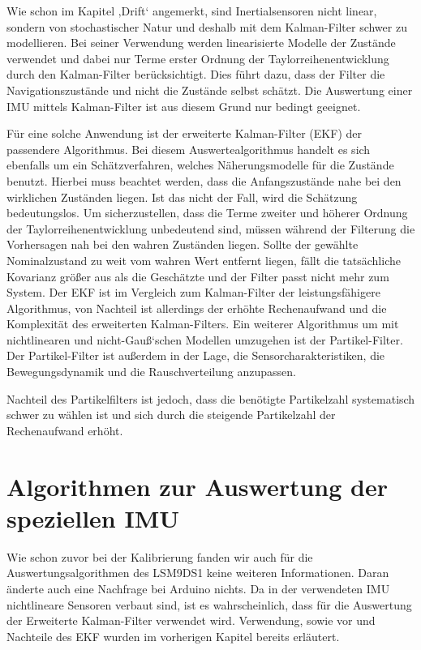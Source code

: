 Wie schon im Kapitel ‚Drift‘ angemerkt, sind Inertialsensoren nicht linear, sondern von stochastischer Natur und deshalb mit dem Kalman-Filter schwer zu modellieren. Bei seiner Verwendung werden linearisierte Modelle der Zustände verwendet und dabei nur Terme erster Ordnung der Taylorreihenentwicklung durch den Kalman-Filter berücksichtigt.  Dies führt dazu, dass der Filter die Navigationszustände und nicht die Zustände selbst schätzt. Die Auswertung einer IMU mittels Kalman-Filter ist aus diesem Grund nur bedingt geeignet. \cite{Georgy:2010} 


Für eine solche Anwendung ist der erweiterte Kalman-Filter (EKF) der passendere Algorithmus. Bei diesem Auswertealgorithmus handelt es sich ebenfalls um ein Schätzverfahren, welches Näherungsmodelle für die Zustände benutzt. Hierbei muss beachtet werden, dass die Anfangszustände nahe bei den wirklichen Zuständen liegen. Ist das nicht der Fall, wird die Schätzung bedeutungslos. Um sicherzustellen, dass die Terme zweiter und höherer Ordnung der Taylorreihenentwicklung unbedeutend sind, müssen während der Filterung die Vorhersagen nah bei den wahren Zuständen liegen. Sollte der gewählte Nominalzustand zu weit vom wahren Wert entfernt liegen, fällt die tatsächliche Kovarianz größer aus als die Geschätzte und der Filter passt nicht mehr zum System. Der EKF ist im Vergleich zum Kalman-Filter der leistungsfähigere Algorithmus, von Nachteil ist allerdings der erhöhte Rechenaufwand und die Komplexität des erweiterten Kalman-Filters. Ein weiterer Algorithmus um mit nichtlinearen und nicht-Gauß‘schen Modellen umzugehen ist der Partikel-Filter. Der Partikel-Filter ist außerdem in der Lage, die Sensorcharakteristiken, die Bewegungsdynamik und die Rauschverteilung anzupassen. \cite{Georgy:2010} 


Nachteil des Partikelfilters ist jedoch, dass die benötigte Partikelzahl systematisch schwer zu wählen ist und sich durch die steigende Partikelzahl der Rechenaufwand erhöht. \cite{Traenkler:2014}


\section{Algorithmen zur Auswertung der speziellen IMU}

Wie schon zuvor bei der Kalibrierung fanden wir auch für die Auswertungsalgorithmen des LSM9DS1 keine weiteren Informationen. Daran änderte auch eine Nachfrage bei Arduino nichts. Da in der verwendeten IMU nichtlineare Sensoren verbaut sind, ist es wahrscheinlich, dass für die Auswertung der Erweiterte Kalman-Filter verwendet wird. Verwendung, sowie vor und Nachteile des EKF wurden im vorherigen Kapitel bereits erläutert.

